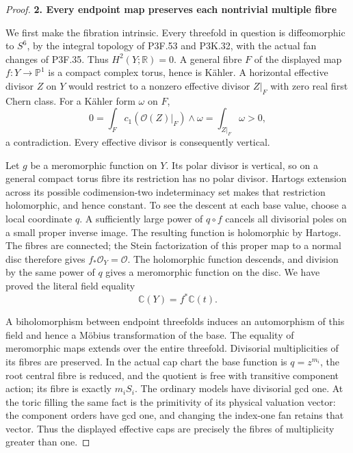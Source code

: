 \begin{proof}
\par

\medskip\noindent\textbf{2. Every endpoint map preserves each nontrivial multiple fibre}

\par\nobreak

We first make the fibration intrinsic. Every threefold in question is
diffeomorphic to \(S^6\), by the integral topology of P3F.53 and
P3K.32, with the actual fan changes of P3F.35. Thus
\(H^2(Y;\mathbb R)=0\). A general fibre \(F\) of the displayed
map \(f:Y\to\mathbb P^1\) is a compact complex torus, hence is
Kähler. A horizontal effective divisor \(Z\) on \(Y\) would
restrict to a nonzero effective divisor \(Z|_F\) with zero real
first Chern class. For a Kähler form \(\omega\) on \(F\),
\[
 0=\int_F c_1(\mathcal O(Z)|_F)\wedge\omega
   =\int_{Z|_F}\omega>0,
\]
a contradiction. Every effective divisor is consequently vertical.

Let \(g\) be a meromorphic function on \(Y\). Its polar divisor
is vertical, so on a general compact torus fibre its restriction
has no polar divisor. Hartogs extension across its possible
codimension-two indeterminacy set makes that restriction holomorphic,
and hence constant. To see the descent at each base value, choose a
local coordinate \(q\). A sufficiently large power of \(q\circ f\)
cancels all divisorial poles on a small proper inverse image. The
resulting function is holomorphic by Hartogs. The fibres are connected;
the Stein factorization of this proper map to a normal disc therefore
gives \(f_*\mathcal O_Y=\mathcal O\). The holomorphic function
descends, and division by the same power of \(q\) gives a meromorphic
function on the disc. We have proved the literal field equality
\[
                    \mathbb C(Y)=f^*\mathbb C(t).       \tag{IM.4}
\]

A biholomorphism between endpoint threefolds induces an automorphism
of this field and hence a Möbius transformation of the base. The
equality of meromorphic maps extends over the entire threefold.
Divisorial multiplicities of its fibres are preserved. In the actual
cap chart the base function is \(q=z^{m_i}\), the root central
fibre is reduced, and the quotient is free with transitive component
action; its fibre is exactly \(m_i S_i\). The ordinary models
have divisorial gcd one. At the toric filling the same fact is the
primitivity of its physical valuation vector: the component orders
have gcd one, and changing the index-one fan retains that vector.
Thus the displayed effective caps are precisely the fibres of
multiplicity greater than one.


\end{proof}
